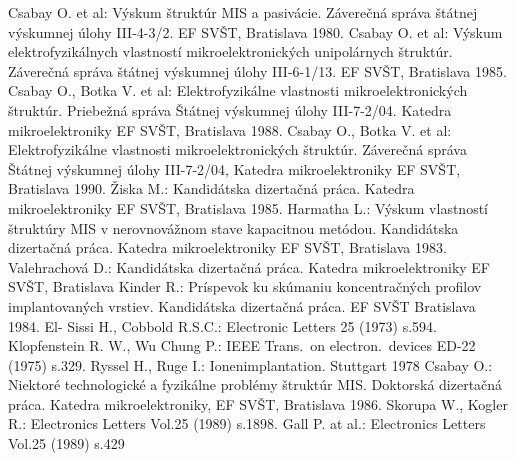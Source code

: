 \begin{thebibliography}{}
 Csabay O. et al: Výskum štruktúr MIS a
  pasivácie. Záverečná správa štátnej výskumnej úlohy III-4-3/2. EF
  SVŠT, Bratislava 1980.
 Csabay O. et al: Výskum elektrofyzikálnych
  vlastností mikroelektronických unipolárnych štruktúr. Záverečná
  správa štátnej výskumnej úlohy III-6-1/13. EF SVŠT, Bratislava 1985.
 Csabay O., Botka V. et al: Elektrofyzikálne
  vlastnosti mikroelektronických štruktúr. Priebežná správa Štátnej
  výskumnej úlohy III-7-2/04. Katedra mikroelektroniky EF SVŠT,
  Bratislava 1988.
 Csabay O., Botka V. et al: Elektrofyzikálne
  vlastnosti mikroelektronických štruktúr. Záverečná správa Štátnej
  výskumnej úlohy III-7-2/04, Katedra mikroelektroniky EF SVŠT,
  Bratislava 1990.
 Žiska M.: Kandidátska dizertačná práca. Katedra
  mikroelektroniky EF SVŠT, Bratislava 1985.
 Harmatha L.: Výskum vlastností štruktúry MIS v
  nerovnovážnom stave kapacitnou metódou. Kandidátska dizertačná
  práca. Katedra mikroelektroniky EF SVŠT, Bratislava 1983.
 Valehrachová D.: Kandidátska dizertačná
  práca. Katedra mikroelektroniky EF SVŠT, Bratislava
 Kinder R.: Príspevok ku skúmaniu koncentračných
  profilov implantovaných vrstiev. Kandidátska dizertačná práca. EF
  SVŠT Bratislava 1984.
El- Sissi H., Cobbold R.S.C.: Electronic Letters 25 (1973) s.594.
 Klopfenstein R. W., Wu Chung P.: IEEE Trans.\ on
  electron.\ devices ED-22 (1975) s.329.
Ryssel H., Ruge I.: Ionenimplantation. Stuttgart 1978
 Csabay O.: Niektoré technologické a fyzikálne
  problémy štruktúr MIS\@. Doktorská dizertačná práca. Katedra
  mikroelektroniky, EF SVŠT, Bratislava 1986.
Skorupa W., Kogler R.: Electronics Letters Vol.25 (1989) s.1898.
Gall P. at al.: Electronics Letters Vol.25 (1989) s.429
\end{thebibliography}
